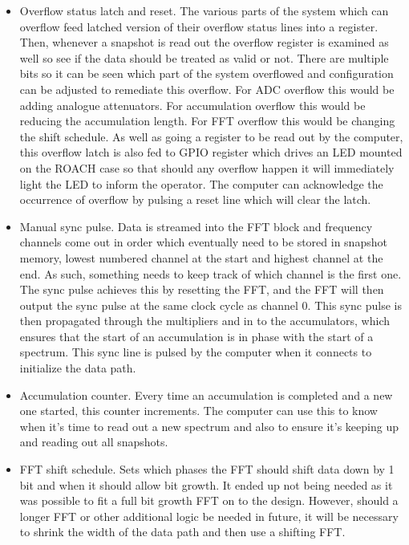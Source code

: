 \begin{itemize}
  \item Overflow status latch and reset. The various parts of the system which can overflow feed latched version of their overflow status lines into a register. Then, whenever a snapshot is read out the overflow register is examined as well so see if the data should be treated as valid or not. There are multiple bits so it can be seen which part of the system overflowed and configuration can be adjusted to remediate this overflow. For ADC overflow this would be adding analogue attenuators. For accumulation overflow this would be reducing the accumulation length. For FFT overflow this would be changing the shift schedule. As well as going a register to be read out by the computer, this overflow latch is also fed to GPIO register which drives an LED mounted on the ROACH case so that should any overflow happen it will immediately light the LED to inform the operator. The computer can acknowledge the occurrence of overflow by pulsing a reset line which will clear the latch.
  \item Manual sync pulse. Data is streamed into the FFT block and frequency channels come out in order which eventually need to be stored in snapshot memory, lowest numbered channel at the start and highest channel at the end. As such, something needs to keep track of which channel is the first one. The sync pulse achieves this by resetting the FFT, and the FFT will then output the sync pulse at the same clock cycle as channel 0. This sync pulse is then propagated through the multipliers and in to the accumulators, which ensures that the start of an accumulation is in phase with the start of a spectrum. This sync line is pulsed by the computer when it connects to initialize the data path.
  \item Accumulation counter. Every time an accumulation is completed and a new one started, this counter increments. The computer can use this to know when it's time to read out a new spectrum and also to ensure it's keeping up and reading out all snapshots.
  \item FFT shift schedule. Sets which phases the FFT should shift data down by 1 bit and when it should allow bit growth. It ended up not being needed as it was possible to fit a full bit growth FFT on to the design. However, should a longer FFT or other additional logic be needed in future, it will be necessary to shrink the width of the data path and then use a shifting FFT.
\end{itemize}

